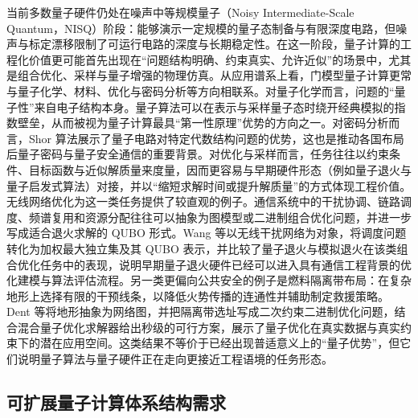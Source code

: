 当前多数量子硬件仍处在噪声中等规模量子（Noisy Intermediate-Scale Quantum，NISQ）阶段：能够演示一定规模的量子态制备与有限深度电路，但噪声与标定漂移限制了可运行电路的深度与长期稳定性\cite{Preskill2018NISQ,NationalAcademies2019QC}。在这一阶段，量子计算的工程化价值更可能首先出现在“问题结构明确、约束真实、允许近似”的场景中，尤其是组合优化、采样与量子增强的物理仿真\cite{Preskill2018NISQ,Cao2019QuantumChemistry}。从应用谱系上看，门模型量子计算更常与量子化学、材料、优化与密码分析等方向相联系\cite{Cao2019QuantumChemistry,Shor1994Algorithms}。对量子化学而言，问题的“量子性”来自电子结构本身。量子算法可以在表示与采样量子态时绕开经典模拟的指数壁垒，从而被视为量子计算最具“第一性原理”优势的方向之一\cite{Cao2019QuantumChemistry}。对密码分析而言，Shor 算法展示了量子电路对特定代数结构问题的优势，这也是推动各国布局后量子密码与量子安全通信的重要背景\cite{Shor1994Algorithms,NationalAcademies2019QC}。对优化与采样而言，任务往往以约束条件、目标函数与近似解质量来度量，因而更容易与早期硬件形态（例如量子退火与量子启发式算法）对接，并以“缩短求解时间或提升解质量”的方式体现工程价值\cite{Preskill2018NISQ}。无线网络优化为这一类任务提供了较直观的例子。通信系统中的干扰协调、链路调度、频谱复用和资源分配往往可以抽象为图模型或二进制组合优化问题，并进一步写成适合退火求解的 QUBO 形式\cite{Wang2016WirelessAnnealing,Phillipson2023QuantumTelecommunicationSurvey}。Wang 等以无线干扰网络为对象，将调度问题转化为加权最大独立集及其 QUBO 表示，并比较了量子退火与模拟退火在该类组合优化任务中的表现，说明早期量子退火硬件已经可以进入具有通信工程背景的优化建模与算法评估流程\cite{Wang2016WirelessAnnealing}。另一类更偏向公共安全的例子是燃料隔离带布局：在复杂地形上选择有限的干预线条，以降低火势传播的连通性并辅助制定救援策略\cite{Dent2026WildfireFuelbreak}。Dent 等将地形抽象为网络图，并把隔离带选址写成二次约束二进制优化问题，结合混合量子优化求解器给出秒级的可行方案，展示了量子优化在真实数据与真实约束下的潜在应用空间\cite{Dent2026WildfireFuelbreak}。这类结果不等价于已经出现普适意义上的“量子优势”，但它们说明量子算法与量子硬件正在走向更接近工程语境的任务形态\cite{Preskill2018NISQ,NationalAcademies2019QC}。

\subsection{可扩展量子计算体系结构需求}

